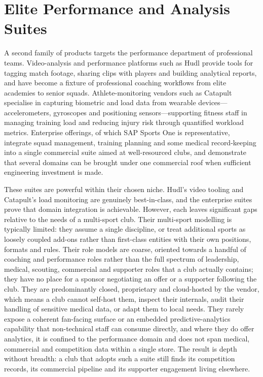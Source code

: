 \section{Elite Performance and Analysis Suites}
\label{sec:lit-performance}

A second family of products targets the performance department of professional teams.
Video-analysis and performance platforms such as Hudl provide tools for tagging match
footage, sharing clips with players and building analytical reports, and have become a
fixture of professional coaching workflows from elite academies to senior squads.
Athlete-monitoring vendors such as Catapult specialise in capturing biometric and load data
from wearable devices---accelerometers, gyroscopes and positioning sensors---supporting
fitness staff in managing training load and reducing injury risk through quantified
workload metrics. Enterprise offerings, of which SAP Sports One is representative, integrate
squad management, training planning and some medical record-keeping into a single
commercial suite aimed at well-resourced clubs, and demonstrate that several domains can be
brought under one commercial roof when sufficient engineering investment is made.

These suites are powerful within their chosen niche. Hudl's video tooling and Catapult's
load monitoring are genuinely best-in-class, and the enterprise suites prove that domain
integration is achievable. However, each leaves significant gaps relative to the needs of a
multi-sport club. Their multi-sport modelling is typically limited: they assume a single
discipline, or treat additional sports as loosely coupled add-ons rather than first-class
entities with their own positions, formats and rules. Their role models are coarse, oriented
towards a handful of coaching and performance roles rather than the full spectrum of
leadership, medical, scouting, commercial and supporter roles that a club actually contains;
they have no place for a sponsor negotiating an offer or a supporter following the club. They
are predominantly closed, proprietary and cloud-hosted by the vendor, which means a club
cannot self-host them, inspect their internals, audit their handling of sensitive medical data,
or adapt them to local needs. They rarely expose a coherent fan-facing surface or an
embedded predictive-analytics capability that non-technical staff can consume directly, and
where they do offer analytics, it is confined to the performance domain and does not span
medical, commercial and competition data within a single store. The result is depth without
breadth: a club that adopts such a suite still finds its competition records, its commercial
pipeline and its supporter engagement living elsewhere.


